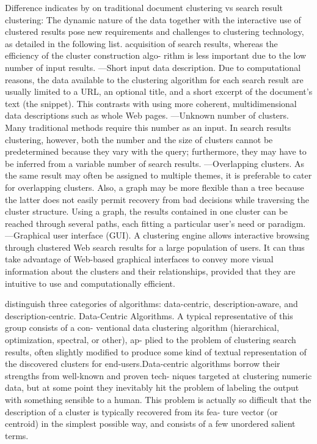 \documentclass[runningheads]{llncs}
\begin{document}
Difference indicates by \cite{Carpineto} on traditional document clustering vs search result clustering:
The dynamic nature of the data together with the interactive use of clustered results pose new requirements and challenges to clustering technology, as detailed in the following list.
acquisition of search results, whereas the efficiency of the cluster construction algo- rithm is less important due to the low number of input results.
—Short input data description. Due to computational reasons, the data available to the clustering algorithm for each search result are usually limited to a URL, an optional title, and a short excerpt of the document’s text (the snippet). This contrasts with using more coherent, multidimensional data descriptions such as whole Web pages.
—Unknown number of clusters. Many traditional methods require this number as an input. In search results clustering, however, both the number and the size of clusters cannot be predetermined because they vary with the query; furthermore, they may have to be inferred from a variable number of search results.
—Overlapping clusters. As the same result may often be assigned to multiple themes, it is preferable to cater for overlapping clusters. Also, a graph may be more flexible than a tree because the latter does not easily permit recovery from bad decisions while traversing the cluster structure. Using a graph, the results contained in one cluster can be reached through several paths, each fitting a particular user’s need or paradigm.
—Graphical user interface (GUI). A clustering engine allows interactive browsing through clustered Web search results for a large population of users. It can thus take advantage of Web-based graphical interfaces to convey more visual information about the clusters and their relationships, provided that they are intuitive to use and computationally efficient.

\cite{Carpiteno} distinguish three categories of algorithms: data-centric, description-aware, and description-centric.
Data-Centric Algorithms. A typical representative of this group consists of a con- ventional data clustering algorithm (hierarchical, optimization, spectral, or other), ap- plied to the problem of clustering search results, often slightly modified to produce some kind of textual representation of the discovered clusters for end-users.Data-centric algorithms borrow their strengths from well-known and proven tech- niques targeted at clustering numeric data, but at some point they inevitably hit the problem of labeling the output with something sensible to a human. This problem is actually so difficult that the description of a cluster is typically recovered from its fea- ture vector (or centroid) in the simplest possible way, and consists of a few unordered salient terms. 
\end{document}
